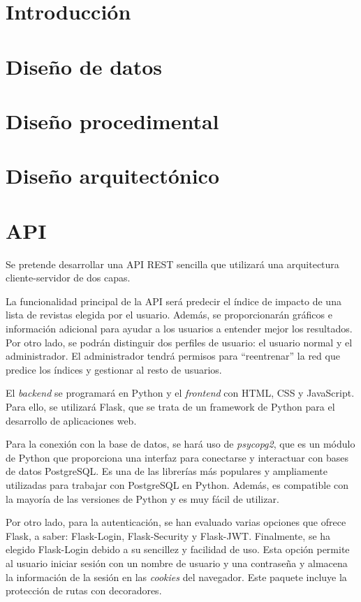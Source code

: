 
\section{Introducción}

\section{Diseño de datos}

\section{Diseño procedimental}

\section{Diseño arquitectónico}





\section{API}

Se pretende desarrollar una API REST sencilla que utilizará una arquitectura cliente-servidor de dos capas.

La funcionalidad principal de la API será predecir el índice de impacto de una lista de revistas elegida por el usuario. Además, se proporcionarán gráficos e información adicional para ayudar a los usuarios a entender mejor los resultados. Por otro lado, se podrán distinguir dos perfiles de usuario: el usuario normal y el administrador. El administrador tendrá permisos para ``reentrenar'' la red que predice los índices y gestionar al resto de usuarios.

El \textit{backend} se programará en Python y el \textit{frontend} con HTML, CSS y JavaScript. Para ello, se utilizará Flask, que se trata de un framework de Python para el desarrollo de aplicaciones web.

Para la conexión con la base de datos, se hará uso de \textit{psycopg2}, que es un módulo de Python que proporciona una interfaz para conectarse y interactuar con bases de datos PostgreSQL. 
Es una de las librerías más populares y ampliamente utilizadas para trabajar con PostgreSQL en Python. Además, es compatible con la mayoría de las versiones de Python y es muy fácil de utilizar.

Por otro lado, para la autenticación, se han evaluado varias opciones que ofrece Flask, a saber: Flask-Login, Flask-Security y Flask-JWT. 
Finalmente, se ha elegido Flask-Login debido a su sencillez y facilidad de uso. Esta opción permite al usuario iniciar sesión con un nombre de usuario y una contraseña y almacena la información de la sesión en las \textit{cookies} del navegador. Este paquete incluye la protección de rutas con decoradores.

